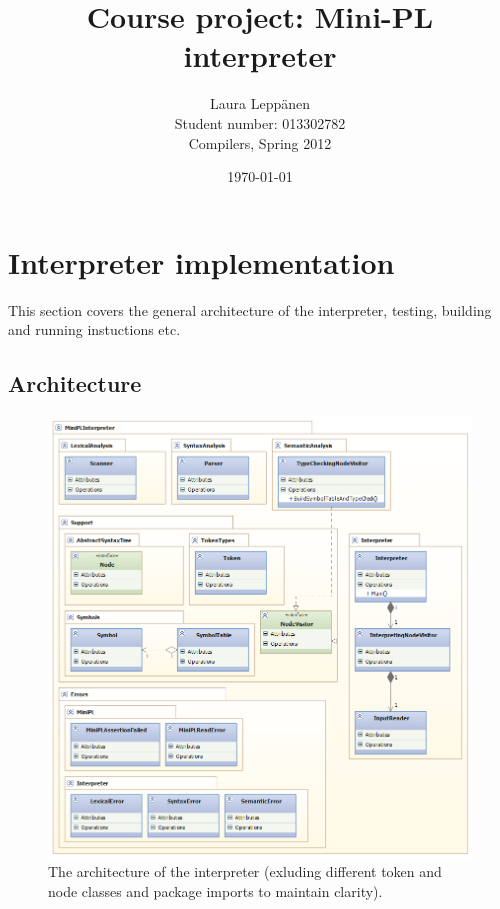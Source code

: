 \documentclass[a4paper,11pt]{article}
\begin{document}
\title{Course project: Mini-PL interpreter}
\author{Laura Leppänen \\ Student number: 013302782 \\ Compilers, Spring 2012}
\date{\today}
\maketitle
\thispagestyle{empty}

\tableofcontents
\onehalfspacing

\newpage
\setcounter{page}{1}

\section{Interpreter implementation}

This section covers the general architecture of the interpreter, testing, building and running instuctions etc.

\subsection{Architecture}

\begin{figure}
    \includegraphics[scale=0.7]{architecture.png}
    \caption{The architecture of the interpreter (exluding different token and node classes and package imports to maintain clarity).}
\end{figure}
\end{document}
